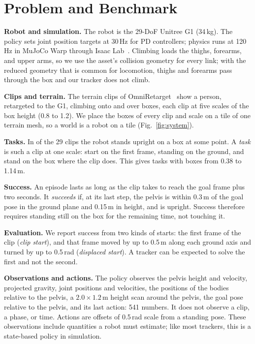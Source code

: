 \section{Problem and Benchmark}
\label{sec:benchmark}

\textbf{Robot and simulation.} The robot is the 29-DoF Unitree G1 (34\,kg). The policy sets joint position targets at 30\,Hz for PD controllers; physics runs at 120\,Hz in MuJoCo Warp through Isaac Lab~\cite{isaaclab}. Climbing loads the thighs, forearms, and upper arms, so we use the asset's collision geometry for every link; with the reduced geometry that is common for locomotion, thighs and forearms pass through the box and our tracker does not climb.

\textbf{Clips and terrain.} The terrain clips of OmniRetarget~\cite{omniretarget} show a person, retargeted to the G1, climbing onto and over boxes, each clip at five scales of the box height (0.8 to 1.2). We place the boxes of every clip and scale on a tile of one terrain mesh, so a world is a robot on a tile (Fig.~\ref{fig:system}).

\textbf{Tasks.} In \clipsall{} of the 29 clips the robot stands upright on a box at some point. A \emph{task} is such a clip at one scale: start on the first frame, standing on the ground, and stand on the box where the clip does. This gives \tasksall{} tasks with boxes from 0.38 to 1.14\,m.

\textbf{Success.} An episode lasts as long as the clip takes to reach the goal frame plus two seconds. It \emph{succeeds} if, at its last step, the pelvis is within 0.3\,m of the goal pose in the ground plane and 0.15\,m in height, and is upright. Success therefore requires standing still on the box for the remaining time, not touching it.

\textbf{Evaluation.} We report success from two kinds of starts: the first frame of the clip (\emph{clip start}), and that frame moved by up to 0.5\,m along each ground axis and turned by up to 0.5\,rad (\emph{displaced start}). A tracker can be expected to solve the first and not the second.

\textbf{Observations and actions.} The policy observes the pelvis height and velocity, projected gravity, joint positions and velocities, the positions of the bodies relative to the pelvis, a $2.0\times1.2$\,m height scan around the pelvis, the goal pose relative to the pelvis, and its last action: 541 numbers. It does not observe a clip, a phase, or time. Actions are offsets of 0.5\,rad scale from a standing pose. These observations include quantities a robot must estimate; like most trackers, this is a state-based policy in simulation.

